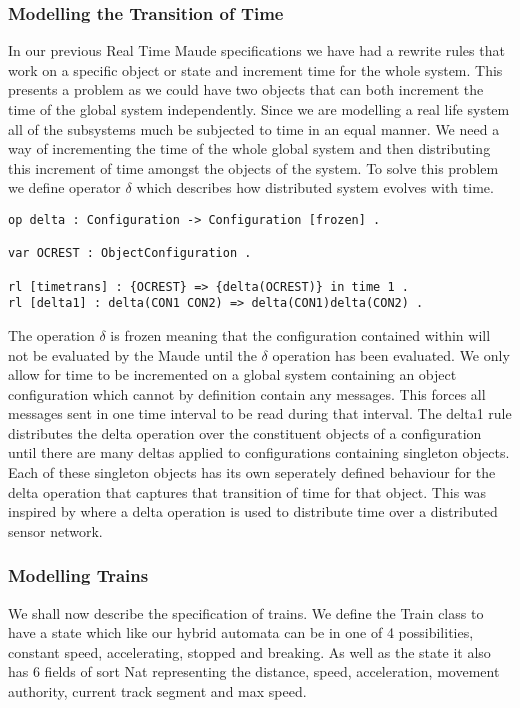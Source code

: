 \subsubsection*{Modelling the Transition of Time}
In our previous Real Time Maude specifications we have had a rewrite rules that work on a specific object or state and increment time for the whole system. This presents a problem as we could have two objects that can both increment the time of the global system independently.  Since we are modelling a real life system all of the subsystems much be subjected to time in an equal manner. We need a way of incrementing the time of the whole global system and then distributing this increment of time amongst the objects of the system. To solve this problem we define operator $\delta$ which describes how distributed system evolves with time.

\begin{lstlisting}[caption = The delta time transition operation, label = code:delta]
op delta : Configuration -> Configuration [frozen] . 

var OCREST : ObjectConfiguration .

rl [timetrans] : {OCREST} => {delta(OCREST)} in time 1 .
rl [delta1] : delta(CON1 CON2) => delta(CON1)delta(CON2) .
\end{lstlisting}

The operation $\delta$ is frozen meaning that the configuration contained within will not be evaluated by the Maude until the $\delta$ operation has been evaluated. We only allow for time to be incremented on a global system containing an object configuration which cannot by definition contain any messages. This forces all messages sent in one time interval to be read during that interval. The delta1 rule distributes the delta operation over the constituent objects of a configuration until there are many deltas applied to configurations containing singleton objects. Each of these singleton objects has its own seperately defined behaviour for the delta operation that captures that transition of time for that object. This was inspired by  \cite{PO07} where a delta operation is used to distribute time over a distributed sensor network. 

\subsubsection*{Modelling Trains}
We shall now describe the specification of trains. We define the Train class to have a state which like our hybrid automata can be in one of 4 possibilities, constant speed, accelerating, stopped and breaking. As well as the state it also has 6 fields of sort Nat representing the distance, speed, acceleration, movement authority,  current track segment and max speed.

